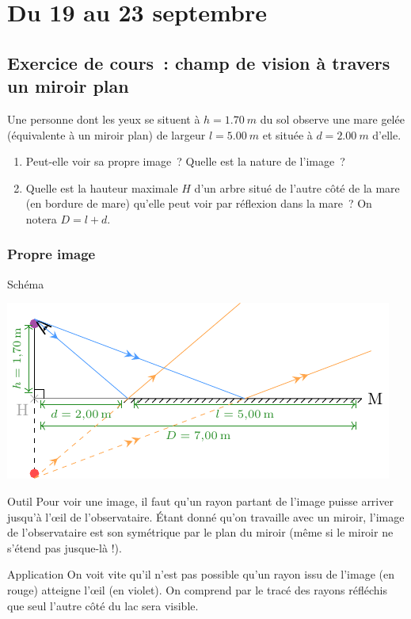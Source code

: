\documentclass[a4paper, 12pt, final, garamond]{book}
\begin{document}
\setcounter{chapter}{1}

\chapter{Du 19 au 23 septembre}
\section*{Exercice de cours~: champ de vision à travers un miroir plan}

Une personne dont les yeux se situent à $h = \SI{1.70}{m}$ du sol observe une
mare gelée (équivalente à un miroir plan) de largeur $l = \SI{5.00}{m}$ et
située à $d = \SI{2.00}{m}$ d'elle.

\begin{enumerate}
    \item Peut-elle voir sa propre image~? Quelle est la nature de l'image~?
    \item Quelle est la hauteur maximale $H$ d'un arbre situé de l'autre côté de
        la mare (en bordure de mare) qu'elle peut voir par réflexion dans la
        mare~? On notera $D = l+d$.
\end{enumerate}

\subsection{Propre image}
\begin{NCdefi}{Schéma}
    \begin{center}
        \includegraphics[width=\linewidth]{ch3-arbre-1}
    \end{center}
\end{NCdefi}
\begin{tcbraster}[raster columns=2, raster equal height=rows]
    \begin{NCrapp}{Outil}
        Pour voir une image, il faut qu'un rayon partant de l'image
        puisse arriver jusqu'à l'œil de l'observataire. Étant donné
        qu'on travaille avec un miroir, l'image de l'observataire est
        son symétrique par le plan du miroir (même si le miroir ne
        s'étend pas jusque-là !).
    \end{NCrapp}
    \begin{NCexem}{Application}
        On voit vite qu'il n'est pas possible qu'un rayon issu de
        l'image (en rouge) atteigne l'œil (en violet). On comprend par
        le tracé des rayons réfléchis que seul l'autre côté du lac sera
        visible.
    \end{NCexem}
\end{tcbraster}
\end{document}

